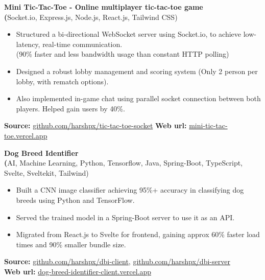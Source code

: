 \documentclass[9.5pt,a4paper]{article}
\begin{document}
\noindent \textbf{Mini Tic-Tac-Toe - Online multiplayer tic-tac-toe game} \\
\textbf(Socket.io, Express.js, Node.js, React.js, Tailwind CSS)
\begin{itemize}[left=0.4cm, itemsep=-2pt, topsep=3pt, partopsep=0pt]
  \setlength{\rightskip}{0.05\textwidth}
  \item Structured a bi-directional WebSocket server using Socket.io, to achieve low-latency, real-time communication.\\(90\% faster and less bandwidth usage than constant HTTP polling)
  \item Designed a robust lobby management and scoring system (Only 2 person per lobby, with rematch options).
  \item Also implemented in-game chat using parallel socket connection between both players. Helped gain users by 40\%.
\end{itemize}
\begin{adjustwidth}{2em}{0pt}
\textbf{Source:} \href{https://github.com/harshpx/tic-tac-toe-socket}{github.com/harshpx/tic-tac-toe-socket} \quad \textbf{Web url:} \href{https://mini-tic-tac-toe.vercel.app}{mini-tic-tac-toe.vercel.app}
\end{adjustwidth}

\vspace*{0.6em}

\noindent \textbf{Dog Breed Identifier} \\
\textbf(AI, Machine Learning, Python, Tensorflow, Java, Spring-Boot, TypeScript, Svelte, Sveltekit, Tailwind)
\begin{itemize}[left=0.4cm, itemsep=-2pt, topsep=3pt, partopsep=0pt]
  \setlength{\rightskip}{0.05\textwidth}
  \item Built a CNN image classifier achieving 95\%+ accuracy in classifying dog breeds using Python and TensorFlow.
  \item Served the trained model in a Spring-Boot server to use it as an API.
  \item Migrated from React.js to Svelte for frontend, gaining approx 60\% faster load times and 90\% smaller bundle size. 
\end{itemize}
\begin{adjustwidth}{2em}{0pt}
\textbf{Source:} \href{https://github.com/harshpx/dbi-client}{github.com/harshpx/dbi-client}, \quad \href{https://github.com/harshpx/dbi-server}{github.com/harshpx/dbi-server} \\
\textbf{Web url:} \href{https://dog-breed-identifier-client.vercel.app}{dog-breed-identifier-client.vercel.app} 
\end{adjustwidth}
\end{document}
